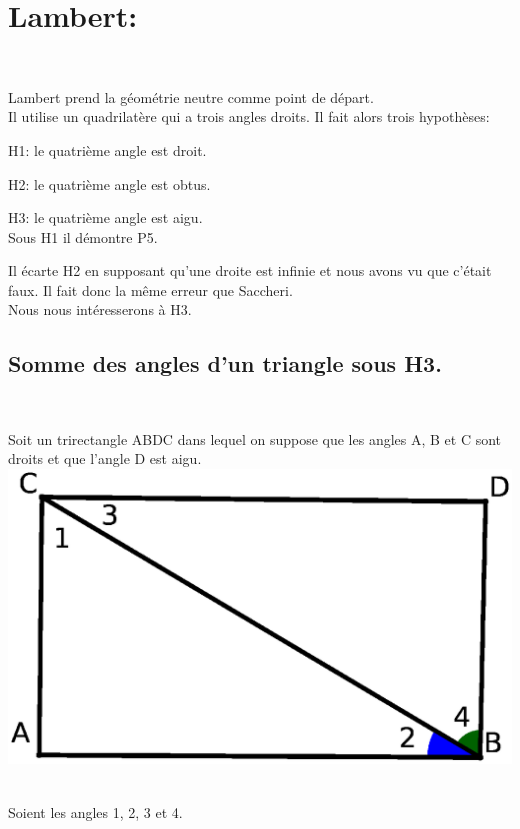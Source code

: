 \documentclass[a4paper, 12pt, twoside]{book}
\begin{document}
    
    
 \newpage    \chapter{Lambert:}\
 
 
 Lambert prend la géométrie neutre comme point de départ.\\
 
 
 
    
 Il utilise un quadrilatère qui a trois angles droits. Il fait alors trois hypothèses:\
 
 H1: le quatrième angle est droit.\
 
 H2: le quatrième angle est obtus.\
 
 H3: le quatrième angle est aigu.\\
 
 Sous H1 il démontre P5.\
 
 Il écarte H2 en supposant qu'une droite est infinie et nous avons vu que c'était faux. Il fait donc la même erreur que Saccheri.\\
 
 Nous nous intéresserons à H3.\
 
 \section{Somme des angles d'un triangle sous H3.}\
 
 
 Soit un trirectangle ABDC dans lequel on suppose que les angles A, B et C sont droits et que l'angle D est aigu.\\
 
  \includegraphics[scale=0.5]{figures/Lambert1.eps} \
  
  Soient les angles 1, 2, 3 et 4.\
  
\end{document}
